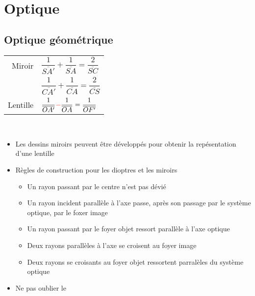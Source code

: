 \documentclass[11pt,a4paper,fleqn,pdftex]{report}
\begin{document}
\chapter{Optique}
\section{Optique géométrique} %
\label{sec:optique_geometrique}
\begin{methode}
   \begin{tabular}{ r l}
      Miroir & $\dfrac{1}{\overline{SA'}} + \dfrac{1}{\overline{SA}}=\dfrac{2}{\overline{SC}}$ \\
             & $\dfrac{1}{\overline{CA'}} + \dfrac{1}{\overline{CA}}=\dfrac{2}{\overline{CS}}$ \\
      Lentille & $\dfrac{1}{\overline{OA'}} \textcolor{couleurImp}{-} \dfrac{1}{\overline{OA}} = \dfrac{1}{\overline{OF'}}$
   \end{tabular}\\
\begin{itemize}[noitemsep, topsep=4pt,parsep=0pt,partopsep=0pt]
  \item Les dessins miroirs peuvent être \og{}développés\fg{} pour obtenir la repésentation d'une lentille
  \item Règles de construction pour les dioptres et les miroirs
  \begin{itemize}[noitemsep, topsep=4pt,parsep=0pt,partopsep=0pt]
    \item Un rayon passant par le centre n'est pas dévié
    \item Un rayon incident parallèle à l'axe passe, après son passage par le système optique, par le foxer image
    \item Un rayon passant par le foyer objet ressort parallèle à l'axe optique
    \item Deux rayons parallèles à l'axe se croisent au foyer image
    \item Deux rayons se croisants au foyer objet ressortent parralèles du système optique
  \end{itemize}
  \item Ne pas oublier le 
\end{itemize}
\end{methode}
\end{document}
